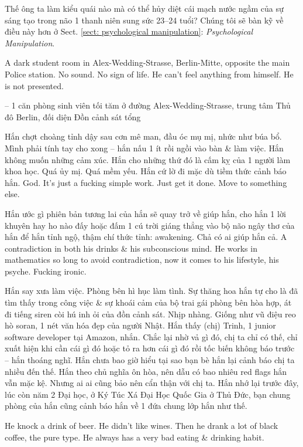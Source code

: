 \documentclass[12pt,oneside]{book}
\begin{document}
Thế ông ta làm kiểu quái nào mà có thể hủy diệt cái mạch nước ngầm của sự sáng tạo trong não 1 thanh niên sung sức 23--24 tuổi? Chúng tôi sẽ bàn kỹ về điều này hơn ở Sect. \ref{sect: psychological manipulation}: {\it Psychological Manipulation}.

A dark student room in Alex-Wedding-Strasse, Berlin-Mitte, opposite the main Police station. No sound. No sign of life. He can't feel anything from himself. He is not presented.

-- 1 căn phòng sinh viên tối tăm ở đường Alex-Wedding-Strasse, trung tâm Thủ đô Berlin, đối diện Đồn cảnh sát tổng 

Hắn chợt choàng tỉnh dậy sau cơn mê man, đầu óc mụ mị, nhức như búa bổ. Mình phải tính tay cho xong -- hắn nấu 1 ít rồi ngồi vào bàn \& làm việc. Hắn không muốn những cảm xúc. Hắn cho những thứ đó là cấm kỵ của 1 người làm khoa học. Quá ủy mị. Quá mềm yếu. Hắn cứ lờ đi mặc dù tiềm thức cảnh báo hắn. God. It's just a fucking simple work. Just get it done. Move to something else.

Hắn ước gì phiên bản tương lai của hắn sẽ quay trở về giúp hắn, cho hắn 1 lời khuyên hay ho nào đấy hoặc đấm 1 cú trời giáng thẳng vào bộ não ngây thơ của hắn để hắn tỉnh ngộ, thậm chí thức tỉnh: awakening. Chả có ai giúp hắn cả. A contradiction in both his drinks \& his subconscious mind. He works in mathematics so long to avoid contradiction, now it comes to his lifestyle, his psyche. Fucking ironic.

Hắn say xưa làm việc. Phòng bên hì hục làm tình. Sự thăng hoa hắn tự cho là đã tìm thấy trong công việc \& sự khoái cảm của bộ trai gái phòng bên hòa hợp, át đi tiếng siren còi hú inh ỏi của đồn cảnh sát. Nhịp nhàng. Giống như vũ điệu reo hò soran, 1 nét văn hóa đẹp của người Nhật. Hắn thấy (chị) Trinh, 1 junior software developer tại Amazon, nhắn. Chắc lại nhờ vả gì đó, chị ta chỉ có thế, chỉ xuất hiện khi cần cái gì đó hoặc tỏ ra hơn cái gì đó rồi tốc biến không báo trước -- hắn thoáng nghĩ. Hắn chưa bao giờ hiểu tại sao bạn bè hắn lại cảnh báo chị ta nhiều đến thế. Hắn theo chủ nghĩa ôn hòa, nên dẫu có bao nhiêu red flags hắn vẫn mặc kệ. Nhưng ai ai cũng bảo nên cẩn thận với chị ta. Hắn nhớ lại trước đây, lúc còn năm 2 Đại học, ở Ký Túc Xá Đại Học Quốc Gia ở Thủ Đức, bạn chung phòng của hắn cũng cảnh báo hắn về 1 đứa chung lớp hắn như thế.

He knock a drink of beer. He didn't like wines. Then he drank a lot of black coffee, the pure type. He always has a very bad eating \& drinking habit.
\end{document}

